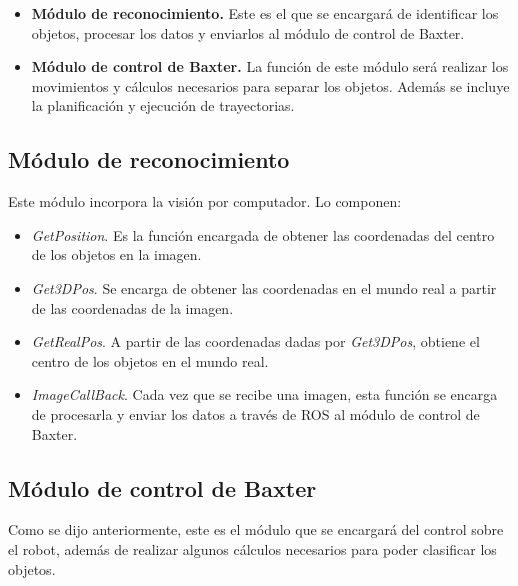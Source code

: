 \begin{itemize}
	\item \textbf{Módulo de reconocimiento.} Este es el que se encargará de identificar los objetos, procesar los datos y enviarlos al módulo de control de Baxter.\\
	\item \textbf{Módulo de control de Baxter.} La función de este módulo será realizar los movimientos y cálculos necesarios para separar los objetos. Además se incluye la planificación y ejecución de trayectorias. \\
\end{itemize}

\subsection{Módulo de reconocimiento}
\noindent Este módulo incorpora la visión por computador. Lo componen: \\

\begin{itemize}
	\item \textit{GetPosition}. Es la función encargada de obtener las coordenadas del centro de los objetos en la imagen.
	\item \textit{Get3DPos}. Se encarga de obtener las coordenadas en el mundo real a partir de las coordenadas de la imagen.
	\item \textit{GetRealPos}. A partir de las coordenadas dadas por \textit{Get3DPos}, obtiene el centro de los objetos en el mundo real.
	\item \textit{ImageCallBack}. Cada vez que se recibe una imagen, esta función se encarga de procesarla y enviar los datos a través de ROS al módulo de control de Baxter.
\end{itemize}

\subsection{Módulo de control de Baxter}
\noindent Como se dijo anteriormente, este es el módulo que se encargará del control sobre el robot, además de realizar algunos cálculos necesarios para poder clasificar los objetos. \\

